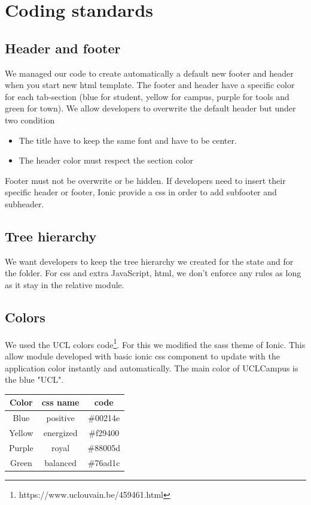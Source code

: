 \documentclass[11pt, a4paper]{report}
\begin{document}
\section{Coding standards}
\subsection{Header and footer}
We managed our code to create automatically a default new footer and header when you start new html template. The footer and header have a specific color for each tab-section (blue for student, yellow for campus, purple for tools and green for town). We allow developers to overwrite the default header but under two condition
\begin{itemize}
\item The title have to keep the same font and have to be center.
\item The header color must respect the section color
\end{itemize}
Footer must not be overwrite or be hidden. If developers need to insert their specific header or footer, Ionic provide a css in order to add subfooter and subheader.
\subsection{Tree hierarchy}
We want developers to keep the tree hierarchy we created for the state and for the folder. For css and extra JavaScript, html, we don't enforce any rules as long as it stay in the relative module.
\subsection{Colors}
We used the UCL colors code\footnote{https://www.uclouvain.be/459461.html}. For this we modified the sass theme of Ionic. This allow module developed with basic ionic css component to update with the application color instantly and automatically. The main color of UCLCampus is the blue "UCL".

\begin{center}
    \begin{tabular}{ | c | c | c |}
    \hline
    Color & css name & code\\ \hline
    Blue & positive & \#00214e\\ \hline
    Yellow & energized & \#f29400\\ \hline
    Purple & royal & \#88005d\\ \hline
    Green & balanced & \#76ad1c\\ \hline
    \end{tabular}
\end{center}
\end{document}
